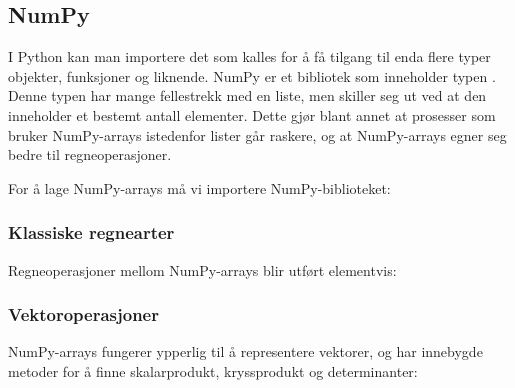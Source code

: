 \subsection{NumPy}
I Python kan man importere det som kalles  for å få tilgang til enda flere typer objekter, funksjoner og liknende. NumPy er et bibliotek som inneholder typen . Denne typen har mange fellestrekk med en liste, men skiller seg ut ved at den inneholder et bestemt antall elementer. Dette gjør blant annet at prosesser som bruker NumPy-arrays istedenfor lister går raskere, og at NumPy-arrays egner seg bedre til regneoperasjoner.\vsk

For å lage NumPy-arrays må vi importere NumPy-biblioteket: \regv
{}
\subsubsection{Klassiske regnearter}
Regneoperasjoner mellom NumPy-arrays blir utført elementvis:
\subsubsection{Vektoroperasjoner}
NumPy-arrays fungerer ypperlig til å representere vektorer, og har innebygde metoder for å finne skalarprodukt, kryssprodukt og determinanter:


\newpage



